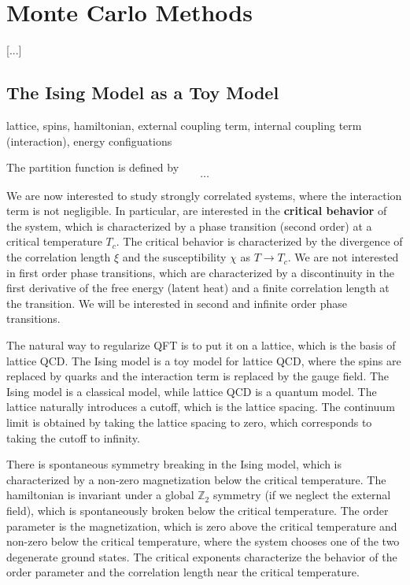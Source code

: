 \chapter{Monte Carlo Methods}

 [...]

\section{The Ising Model as a Toy Model}

lattice, spins, hamiltonian, external coupling term, internal coupling term (interaction), energy configuations

The partition function is defined by
\[
    \dots
\]

We are now interested to study strongly correlated systems, where the interaction term is not negligible. In particular, are interested in the \textbf{critical behavior} of the system, which is characterized by a phase transition (second order) at a critical temperature $T_c$. The critical behavior is characterized by the divergence of the correlation length $\xi$ and the susceptibility $\chi$ as $T \to T_c$. We are not interested in first order phase transitions, which are characterized by a discontinuity in the first derivative of the free energy (latent heat) and a finite correlation length at the transition. We will be interested in second and infinite order phase transitions.

\begin{remark}
    The natural way to regularize QFT is to put it on a lattice, which is the basis of lattice QCD. The Ising model is a toy model for lattice QCD, where the spins are replaced by quarks and the interaction term is replaced by the gauge field. The Ising model is a classical model, while lattice QCD is a quantum model. The lattice naturally introduces a cutoff, which is the lattice spacing. The continuum limit is obtained by taking the lattice spacing to zero, which corresponds to taking the cutoff to infinity.
\end{remark}

There is spontaneous symmetry breaking in the Ising model, which is characterized by a non-zero magnetization below the critical temperature. The hamiltonian is invariant under a global $\mathbb{Z}_2$ symmetry (if we neglect the external field), which is spontaneously broken below the critical temperature. The order parameter is the magnetization, which is zero above the critical temperature and non-zero below the critical temperature, where the system chooses one of the two degenerate ground states. The critical exponents characterize the behavior of the order parameter and the correlation length near the critical temperature.

